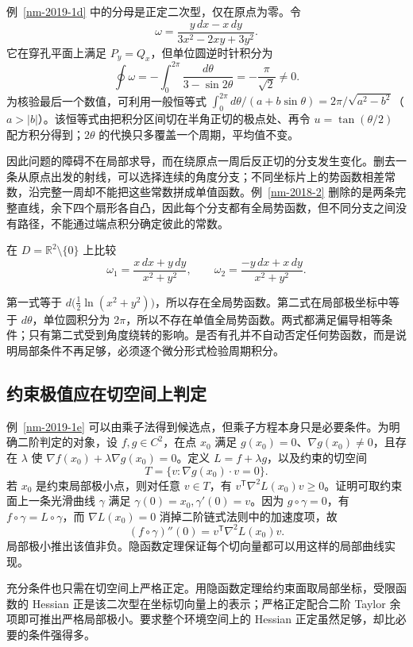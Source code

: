 \documentclass[12pt,fontset=fandol]{ctexart}
\begin{document}
例~\ref{nm-2019-1d} 中的分母是正定二次型，仅在原点为零。令
\[
 \omega=\frac{y\,dx-x\,dy}{3x^2-2xy+3y^2}.
\]
它在穿孔平面上满足 $P_y=Q_x$，但单位圆逆时针积分为
\[
 \oint\omega=-\int_0^{2\pi}\frac{d\theta}{3-\sin2\theta}
 =-\frac\pi{\sqrt2}\ne0.
\]
为核验最后一个数值，可利用一般恒等式 $\int_0^{2\pi}d\theta/(a+b\sin\theta)=2\pi/\sqrt{a^2-b^2}$（$a>|b|$）。该恒等式由把积分区间切在半角正切的极点处、再令 $u=\tan(\theta/2)$ 配方积分得到；$2\theta$ 的代换只多覆盖一个周期，平均值不变。

因此问题的障碍不在局部求导，而在绕原点一周后反正切的分支发生变化。删去一条从原点出发的射线，可以选择连续的角度分支；不同坐标片上的势函数相差常数，沿完整一周却不能把这些常数拼成单值函数。例~\ref{nm-2018-2} 删除的是两条完整直线，余下四个扇形各自凸，因此每个分支都有全局势函数，但不同分支之间没有路径，不能通过端点积分确定彼此的常数。

\begin{example}
在 $D=\mathbb R^2\setminus\{0\}$ 上比较
\[
 \omega_1=\frac{x\,dx+y\,dy}{x^2+y^2},\qquad
 \omega_2=\frac{-y\,dx+x\,dy}{x^2+y^2}.
\]
\end{example}
\begin{solve}
第一式等于 $d\bigl(\tfrac12\ln(x^2+y^2)\bigr)$，所以存在全局势函数。第二式在局部极坐标中等于 $d\theta$，单位圆积分为 $2\pi$，所以不存在单值全局势函数。两式都满足偏导相等条件；只有第二式受到角度绕转的影响。是否有孔并不自动否定任何势函数，而是说明局部条件不再足够，必须逐个微分形式检验周期积分。
\end{solve}

\subsection{约束极值应在切空间上判定}
例~\ref{nm-2019-1e} 可以由乘子法得到候选点，但乘子方程本身只是必要条件。为明确二阶判定的对象，设 $f,g\in C^2$，在点 $x_0$ 满足 $g(x_0)=0$、$\nabla g(x_0)\ne0$，且存在 $\lambda$ 使 $\nabla f(x_0)+\lambda\nabla g(x_0)=0$。定义 $L=f+\lambda g$，以及约束的切空间
\[
 T=\{v:\nabla g(x_0)\cdot v=0\}.
\]
若 $x_0$ 是约束局部极小点，则对任意 $v\in T$，有 $v^{\mathsf T}\nabla^2L(x_0)v\geq0$。证明可取约束面上一条光滑曲线 $\gamma$ 满足 $\gamma(0)=x_0,\gamma'(0)=v$。因为 $g\circ\gamma=0$，有 $f\circ\gamma=L\circ\gamma$，而 $\nabla L(x_0)=0$ 消掉二阶链式法则中的加速度项，故
\[
 (f\circ\gamma)''(0)=v^{\mathsf T}\nabla^2L(x_0)v.
\]
局部极小推出该值非负。隐函数定理保证每个切向量都可以用这样的局部曲线实现。

充分条件也只需在切空间上严格正定。用隐函数定理给约束面取局部坐标，受限函数的 Hessian 正是该二次型在坐标切向量上的表示；严格正定配合二阶 Taylor 余项即可推出严格局部极小。要求整个环境空间上的 Hessian 正定虽然足够，却比必要的条件强得多。
\end{document}
